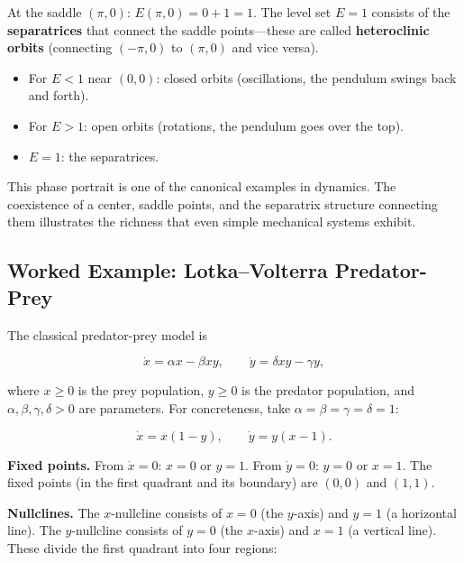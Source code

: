 At the saddle $(\pi, 0)$: $E(\pi, 0) = 0 + 1 = 1$. The level set $E = 1$ consists of the \textbf{separatrices} that connect the saddle points---these are called \textbf{heteroclinic orbits} (connecting $(-\pi, 0)$ to $(\pi, 0)$ and vice versa).

\begin{itemize}[nosep]
  \item For $E < 1$ near $(0,0)$: closed orbits (oscillations, the pendulum swings back and forth).
  \item For $E > 1$: open orbits (rotations, the pendulum goes over the top).
  \item $E = 1$: the separatrices.
\end{itemize}

This phase portrait is one of the canonical examples in dynamics. The coexistence of a center, saddle points, and the separatrix structure connecting them illustrates the richness that even simple mechanical systems exhibit.

\subsection{Worked Example: Lotka--Volterra Predator-Prey}\label{sec:3.4.3}

The classical predator-prey model is

\begin{equation}\label{eq:3.7}\tag{3.7}
\dot{x} = \alpha x - \beta x y, \qquad \dot{y} = \delta x y - \gamma y,
\end{equation}

where $x \geq 0$ is the prey population, $y \geq 0$ is the predator population, and $\alpha, \beta, \gamma, \delta > 0$ are parameters. For concreteness, take $\alpha = \beta = \gamma = \delta = 1$:

\begin{equation}\label{eq:3.8}\tag{3.8}
\dot{x} = x(1 - y), \qquad \dot{y} = y(x - 1).
\end{equation}

\textbf{Fixed points.} From $\dot{x} = 0$: $x = 0$ or $y = 1$. From $\dot{y} = 0$: $y = 0$ or $x = 1$. The fixed points (in the first quadrant and its boundary) are $(0, 0)$ and $(1, 1)$.

\textbf{Nullclines.} The $x$-nullcline consists of $x = 0$ (the $y$-axis) and $y = 1$ (a horizontal line). The $y$-nullcline consists of $y = 0$ (the $x$-axis) and $x = 1$ (a vertical line). These divide the first quadrant into four regions:

